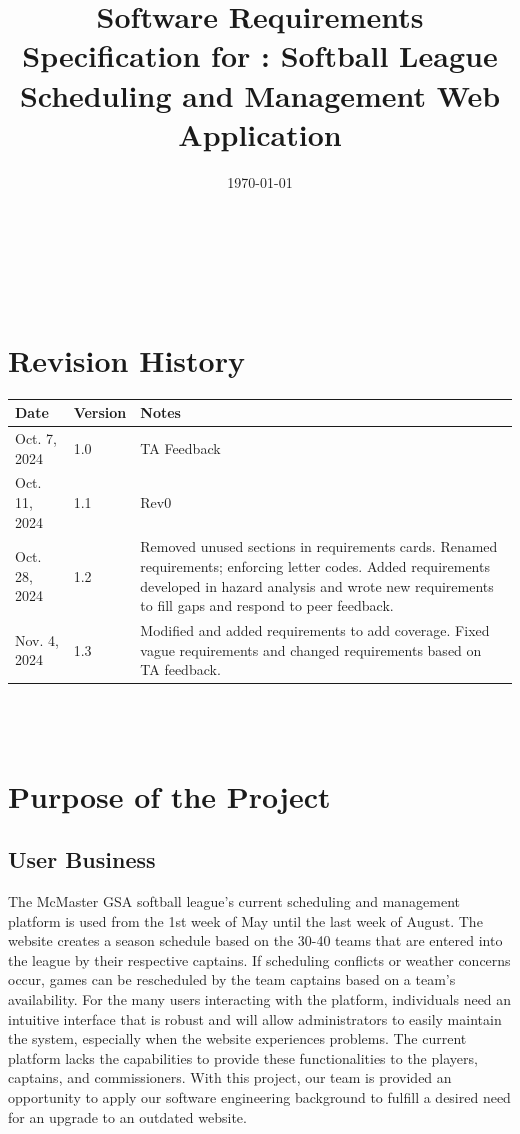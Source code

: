 \documentclass[12pt]{article}
\begin{document}
\title{Software Requirements Specification for \progname: Softball League Scheduling and Management Web Application} 
\author{\authname}
\date{\today}
	
\maketitle

~\newpage


\tableofcontents

~\newpage

\section*{Revision History}

\begin{tabularx}{\textwidth}{p{3cm}p{2cm}X}
\toprule {\textbf{Date}} & {\textbf{Version}} & {\textbf{Notes}}\\
\midrule
Oct. 7, 2024 & 1.0 & TA Feedback\\
Oct. 11, 2024 & 1.1 & Rev0\\
Oct. 28, 2024 & 1.2 & Removed unused sections in requirements cards. Renamed
requirements; enforcing letter codes. Added requirements developed in hazard
analysis and wrote new requirements to fill gaps and respond to peer feedback.
\\
Nov. 4, 2024 & 1.3 & Modified and added requirements to add coverage. Fixed
vague requirements and changed requirements based on TA feedback.\\
\bottomrule
\end{tabularx}

~\\

~\newpage
\section{Purpose of the Project}

\subsection{User Business}

The McMaster GSA softball league's current scheduling and management platform
is used from the 1st week of May until the last week of August. The website
creates a season schedule based on the 30-40 teams that are entered into the
league by their respective captains. If scheduling conflicts or weather concerns
occur, games can be rescheduled by the team captains based on a team's
availability. For the many users interacting with the platform, individuals need
an intuitive interface that is robust and will allow administrators to easily
maintain the system, especially when the website experiences problems. The current
platform lacks the capabilities to provide these functionalities to the players,
captains, and commissioners. With this project, our team is provided an
opportunity to apply our software engineering background to fulfill a
desired need for an upgrade to an outdated website.
\end{document}
